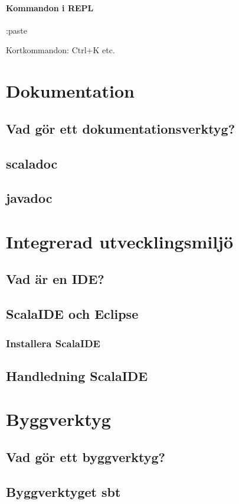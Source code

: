 \documentclass[a4paper]{compendium}
\begin{document}
\subsubsection{Kommandon i REPL}
:paste

Kortkommandon: Ctrl+K etc.

\chapter{Dokumentation}
\section{Vad gör ett dokumentationsverktyg?}
\section{scaladoc}
\section{javadoc}

\chapter{Integrerad utvecklingsmiljö}
\section{Vad är en IDE?}
\section{ScalaIDE och Eclipse}
\subsection{Installera ScalaIDE}
\section{Handledning ScalaIDE}

\chapter{Byggverktyg}
\section{Vad gör ett byggverktyg?}
\section{Byggverktyget sbt}
\end{document}
